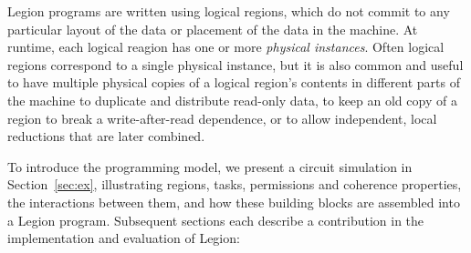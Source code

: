 \documentclass[conference]{IEEEtran}
\begin{document}
Legion programs are written using logical regions, which do not commit
to any particular layout of the data or placement of the data in the machine.  At runtime,
each logical reagion has one or more {\em physical instances}.  Often
logical regions correspond to a single physical instance, but it is also common and useful
to have multiple physical copies of a logical region's contents in different parts of the machine 
to duplicate and distribute read-only data, to keep an old copy of a region to break a 
write-after-read dependence, or to allow independent, local reductions that are later combined.

To introduce the programming model, we present
a circuit simulation in
Section~\ref{sec:ex}, illustrating regions, tasks,
permissions and coherence properties, the interactions between them,
and how these building blocks are assembled into a Legion
program.  Subsequent sections each describe a contribution in the
implementation and evaluation of Legion:


 
\end{document}
